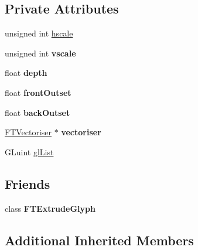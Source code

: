 \subsection*{Private Attributes}
\begin{DoxyCompactItemize}
\item 
unsigned int \hyperlink{class_f_t_extrude_glyph_impl_aa27acc709f32e8bf52cd41bad475f4da}{hscale}
\item 
unsigned int {\bfseries vscale}\hypertarget{class_f_t_extrude_glyph_impl_adde3cbe9ff98c430a21dcab6263654c1}{}\label{class_f_t_extrude_glyph_impl_adde3cbe9ff98c430a21dcab6263654c1}

\item 
float {\bfseries depth}\hypertarget{class_f_t_extrude_glyph_impl_a5cf6f5ba3653dae80add20b5f3c1ee0c}{}\label{class_f_t_extrude_glyph_impl_a5cf6f5ba3653dae80add20b5f3c1ee0c}

\item 
float {\bfseries front\+Outset}\hypertarget{class_f_t_extrude_glyph_impl_a71903184bae7b62ea6020f7cbabf3c64}{}\label{class_f_t_extrude_glyph_impl_a71903184bae7b62ea6020f7cbabf3c64}

\item 
float {\bfseries back\+Outset}\hypertarget{class_f_t_extrude_glyph_impl_a0fecc8172f7a7ca20cae459d81c37cf0}{}\label{class_f_t_extrude_glyph_impl_a0fecc8172f7a7ca20cae459d81c37cf0}

\item 
\hyperlink{class_f_t_vectoriser}{F\+T\+Vectoriser} $\ast$ {\bfseries vectoriser}\hypertarget{class_f_t_extrude_glyph_impl_adb1542a52ba85f275ec9386257102f80}{}\label{class_f_t_extrude_glyph_impl_adb1542a52ba85f275ec9386257102f80}

\item 
G\+Luint \hyperlink{class_f_t_extrude_glyph_impl_a268ab0a14d4109431a97fba862b60c8e}{gl\+List}
\end{DoxyCompactItemize}
\subsection*{Friends}
\begin{DoxyCompactItemize}
\item 
class {\bfseries F\+T\+Extrude\+Glyph}\hypertarget{class_f_t_extrude_glyph_impl_a43bdcab05c1db93d9474fee8176c1fb0}{}\label{class_f_t_extrude_glyph_impl_a43bdcab05c1db93d9474fee8176c1fb0}

\end{DoxyCompactItemize}
\subsection*{Additional Inherited Members}


